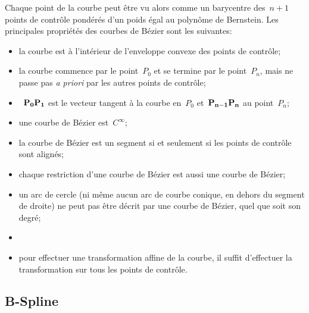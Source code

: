 Chaque point de la courbe peut être vu alors comme un barycentre des~$n+1$ points de contrôle pondérés d'un poids égal au polynôme de Bernstein. 
Les principales propriétés des courbes de Bézier sont les suivantes:
\begin{itemize}
\item la courbe est à l'intérieur de l'enveloppe convexe des points de contrôle; 
\item la courbe commence par le point~$P_0$ et se termine par le point~$P_n$, mais ne passe pas \emph{a priori} par les autres points de contrôle;
\item~$\mathbf{P_0P_1}$ est le vecteur tangent à la courbe en~$P_0$ et~$\mathbf{P_{n-1}P_n}$ au point~$P_n$;
\item une courbe de Bézier est~$C^{\infty}$;
\item la courbe de Bézier est un segment si et seulement si les points de contrôle sont alignés;
\item chaque restriction d'une courbe de Bézier est aussi une courbe de Bézier;
\item un arc de cercle (ni même aucun arc de courbe conique, en dehors du segment de droite) ne peut pas être décrit par une courbe de Bézier, quel que soit son degré;
\item {}
\item pour effectuer une transformation affine de la courbe, il suffit d'effectuer la transformation sur tous les points de contrôle. 
\end{itemize}

\medskip
\subsection{B-Spline}


